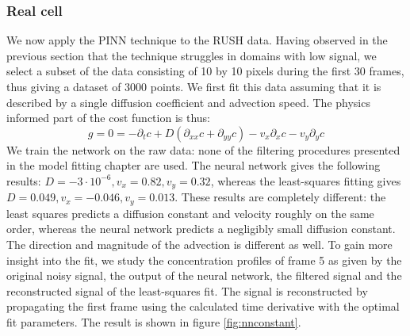 \documentclass{Dissertate}
\begin{document}
\hypertarget{real-cell}{%
\subsubsection{Real cell}\label{real-cell}}

We now apply the PINN technique to the RUSH data. Having observed in the
previous section that the technique struggles in domains with low
signal, we select a subset of the data consisting of 10 by 10 pixels
during the first 30 frames, thus giving a dataset of 3000 points. We
first fit this data assuming that it is described by a single diffusion
coefficient and advection speed. The physics informed part of the cost
function is thus: \[
g=0=-\partial_tc+D(\partial_{xx}c+\partial_{yy}c)-v_x\partial_xc-v_y\partial_yc
\] We train the network on the raw data: none of the filtering
procedures presented in the model fitting chapter are used. The neural
network gives the following results:
\(D=-3\cdot10^{-6}, v_x=0.82, v_y=0.32\), whereas the least-squares
fitting gives \(D=0.049, v_x=-0.046, v_y=0.013\). These results are
completely different: the least squares predicts a diffusion constant
and velocity roughly on the same order, whereas the neural network
predicts a negligibly small diffusion constant. The direction and magnitude
of the advection is different as well. To gain more insight into the
fit, we study the concentration profiles of frame 5 as given by the
original noisy signal, the output of the neural network, the filtered
signal and the reconstructed signal of the least-squares fit. The signal is
reconstructed by propagating the first frame using the calculated time derivative with the optimal fit parameters. The result is shown in figure
\ref{fig:nnconstant}.
\end{document}
